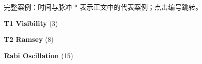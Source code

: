 \begin{frame}[label=case-index]{完整案例：时间与脉冲}
\setlength{\parskip}{.6mm}\small
* 表示正文中的代表案例；点击编号跳转。\par\vspace{2mm}
\textbf{T1 Visibility} (3)\par \hyperlink{case-t1-001}{} \hyperlink{case-t1-004}{} \hyperlink{case-t1-005}{}\par\vspace{2mm}
\textbf{T2 Ramsey} (8)\par \hyperlink{case-ramsey-001}{} \hyperlink{case-ramsey-002}{} \hyperlink{case-ramsey-003}{} \hyperlink{case-ramsey-004}{} \hyperlink{case-ramsey-005}{} \hyperlink{case-ramsey-006}{} \hyperlink{case-ramsey-007}{} \hyperlink{case-ramsey-008}{}\par\vspace{2mm}
\textbf{Rabi Oscillation} (15)\par \hyperlink{case-rabi-001}{} \hyperlink{case-rabi-003}{} \hyperlink{case-rabi-004}{} \hyperlink{case-rabi-005}{} \hyperlink{case-rabi-006}{} \hyperlink{case-rabi-007}{} \hyperlink{case-rabi-008}{} \hyperlink{case-rabi-009}{}\par\vspace{1mm}\hyperlink{case-rabi-010}{} \hyperlink{case-rabi-011}{} \hyperlink{case-rabi-012}{} \hyperlink{case-rabi-013}{} \hyperlink{case-rabi-014}{} \hyperlink{case-rabi-015}{} \hyperlink{case-rabi-016}{}\par\vspace{2mm}
\vfill\hyperlink{case-index-other}{}
\end{frame}
